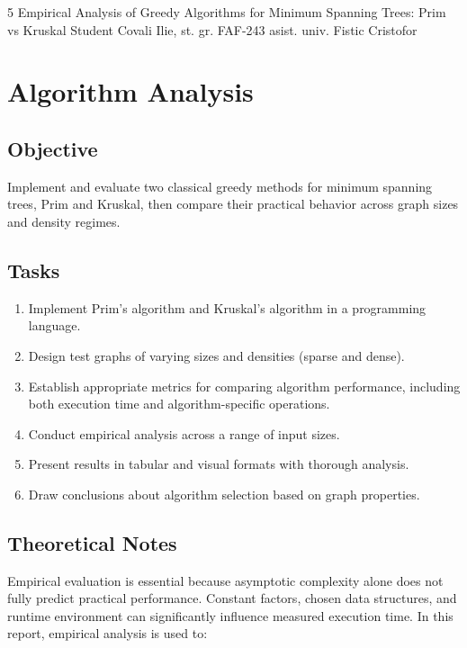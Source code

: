 \documentclass{labreport}
\begin{document}
\labtitle
    {5}
    {Empirical Analysis of Greedy Algorithms for Minimum Spanning Trees: Prim vs Kruskal}
    {Student}
    {Covali Ilie, st. gr. FAF-243}
    {asist. univ. Fistic Cristofor}

\tableofcontents
\newpage

\lstset{style=python}

\section{Algorithm Analysis}

\subsection{Objective}

Implement and evaluate two classical greedy methods for minimum spanning trees, Prim and Kruskal, then compare their practical behavior across graph sizes and density regimes.

\subsection{Tasks}

\begin{enumerate}
    \item Implement Prim's algorithm and Kruskal's algorithm in a programming language.
    \item Design test graphs of varying sizes and densities (sparse and dense).
    \item Establish appropriate metrics for comparing algorithm performance, including both execution time and algorithm-specific operations.
    \item Conduct empirical analysis across a range of input sizes.
    \item Present results in tabular and visual formats with thorough analysis.
    \item Draw conclusions about algorithm selection based on graph properties.
\end{enumerate}

\subsection{Theoretical Notes}

Empirical evaluation is essential because asymptotic complexity alone does not fully predict practical performance. Constant factors, chosen data structures, and runtime environment can significantly influence measured execution time. In this report, empirical analysis is used to:
\end{document}

